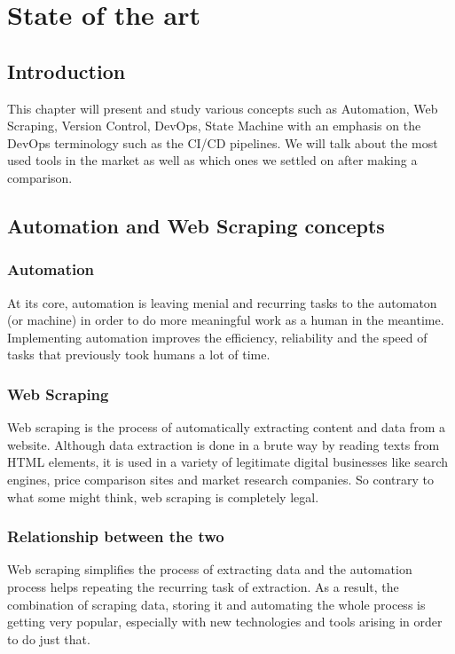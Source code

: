 \chapter{ State of the art }
\newpage

\setcounter{secnumdepth}{0} %
\section{Introduction}
This chapter will present and study various concepts such as Automation, Web Scraping, Version Control, DevOps, State Machine with an emphasis on the DevOps terminology such as the CI/CD pipelines.
We will talk about the most used tools in the market as well as which ones we settled on after making a comparison.

\setcounter{secnumdepth}{2} %
\section{Automation and Web Scraping concepts}
\subsection{Automation}
At its core, automation is leaving menial and recurring tasks to the automaton (or machine) in order to do more meaningful work as a human in the meantime.
Implementing automation improves the efficiency, reliability and the speed of tasks that previously took humans a lot of time.
\subsection{Web Scraping}
Web scraping is the process of automatically extracting content and data from a website.
Although data extraction is done in a brute way by reading texts from HTML elements, it is used in a variety of legitimate digital businesses like search engines, price comparison sites and market research companies.
So contrary to what some might think, web scraping is completely legal.
\subsection{Relationship between the two}
Web scraping simplifies the process of extracting data and the automation process helps repeating the recurring task of extraction.
As a result, the combination of scraping data, storing it and automating the whole process is getting very popular, especially with new technologies and tools arising in order to do just that.

